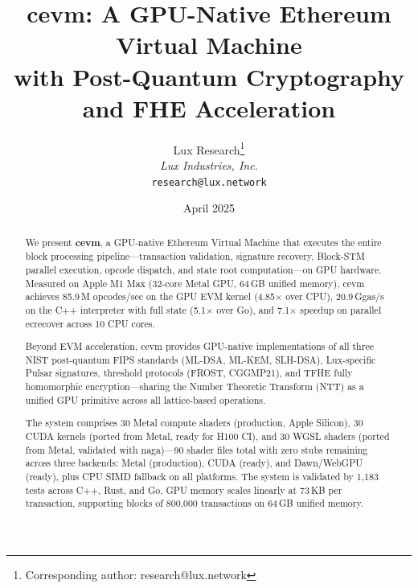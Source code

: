 \documentclass[11pt]{article}
\title{cevm: A GPU-Native Ethereum Virtual Machine\\with Post-Quantum Cryptography and FHE Acceleration}
\author{
Lux Research\thanks{Corresponding author: research@lux.network}\\
\textit{Lux Industries, Inc.}\\
\texttt{research@lux.network}
}
\date{April 2025}
\begin{document}
\luxcoverpage

\begin{abstract}
We present \textbf{cevm}, a GPU-native Ethereum Virtual Machine that executes the entire
block processing pipeline---transaction validation, signature recovery, Block-STM parallel
execution, opcode dispatch, and state root computation---on GPU hardware. Measured on
Apple M1 Max (32-core Metal GPU, 64\,GB unified memory), cevm achieves 85.9\,M opcodes/sec
on the GPU EVM kernel (4.85$\times$ over CPU), 20.9\,Ggas/s on the C++ interpreter with
full state (5.1$\times$ over Go), and 7.1$\times$ speedup on parallel ecrecover across 10 CPU
cores.

Beyond EVM acceleration, cevm provides GPU-native implementations of all three NIST
post-quantum FIPS standards (ML-DSA, ML-KEM, SLH-DSA), Lux-specific Pulsar signatures,
threshold protocols (FROST, CGGMP21), and TFHE fully homomorphic encryption---sharing
the Number Theoretic Transform (NTT) as a unified GPU primitive across all lattice-based
operations.

The system comprises 30 Metal compute shaders (production, Apple Silicon), 30 CUDA kernels
(ported from Metal, ready for H100 CI), and 30 WGSL shaders (ported from Metal, validated
with naga)---90 shader files total with zero stubs remaining across three backends: Metal
(production), CUDA (ready), and Dawn/WebGPU (ready), plus CPU SIMD fallback on all
platforms. The system is validated by 1{,}183 tests across C++, Rust, and Go. GPU memory
scales linearly at 73\,KB per transaction, supporting blocks of 800{,}000 transactions on
64\,GB unified memory.
\end{abstract}

\tableofcontents
\newpage














\end{document}
